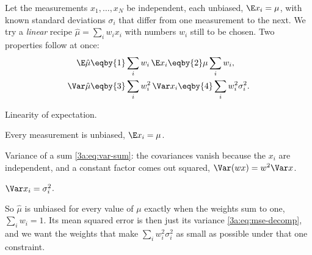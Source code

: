 Let the measurements $x_1,\dots,x_N$ be independent, each unbiased,
$\E x_i=\mu$, with known standard deviations $\sigma_i$ that differ from one
measurement to the next. We try a \emph{linear} recipe
$\hat\mu=\sum_iw_ix_i$ with numbers $w_i$ still to be chosen. Two
properties follow at once:
\begin{align}
  \E\hat\mu &\eqby{1} \sum_i w_i\,\E x_i \eqby{2} \mu\sum_i w_i ,
  \label{3a:eq:wmean-bias}\\
  \Var\hat\mu &\eqby{3} \sum_i w_i^2\,\Var x_i \eqby{4} \sum_i w_i^2\sigma_i^2 .
  \label{3a:eq:wmean-var}
\end{align}
\begin{explain}
  \item Linearity of expectation.
  \item Every measurement is unbiased, $\E x_i=\mu$.
  \item Variance of a sum \eqref{3a:eq:var-sum}: the covariances vanish
        because the $x_i$ are independent, and a constant factor comes out
        squared, $\Var(wx)=w^2\Var x$.
  \item $\Var x_i=\sigma_i^2$.
\end{explain}
So $\hat\mu$ is unbiased for every value of $\mu$ exactly when the weights
sum to one, $\sum_iw_i=1$. Its mean squared error is then just its variance
\eqref{3a:eq:mse-decomp}, and we want the weights that make
$\sum_iw_i^2\sigma_i^2$ as small as possible under that one constraint.

